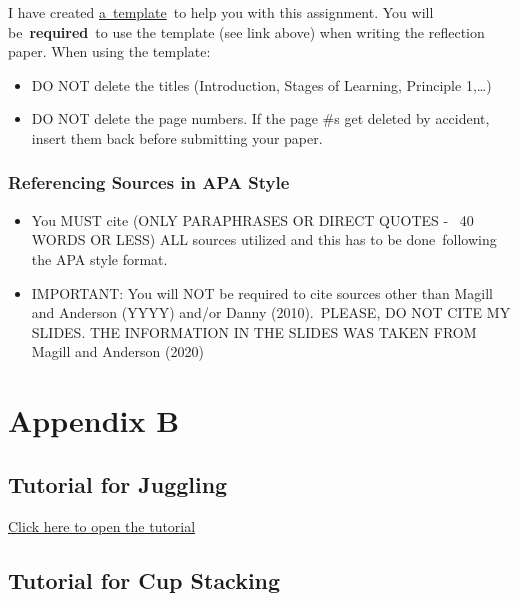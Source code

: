 \documentclass[
  letterpaper,
  DIV=11,
  numbers=noendperiod]{scrartcl}
\providecommand{\tightlist}{%
  \setlength{\itemsep}{0pt}\setlength{\parskip}{0pt}}\usepackage{longtable,booktabs,array}
\begin{document}
I have created
\href{https://docs.google.com/document/d/1zp0yN8EAQg6W9ecifHZ8NLonoi3ZMkrI/edit?usp=share_link\&ouid=102808224946914322692\&rtpof=true\&sd=true}{a~template}~to
help you with this assignment. You will be~\textbf{required}~to use the
template (see link above) when writing the reflection paper. When using
the template:

\begin{itemize}
\tightlist
\item
  DO NOT delete the titles (Introduction, Stages of Learning, Principle
  1,\ldots)
\item
  DO NOT delete the page numbers. If the page \#s get deleted by
  accident, insert them back before submitting your paper.
\end{itemize}

\hypertarget{referencing-sources-in-apa-style}{%
\subsubsection{Referencing Sources in APA
Style}\label{referencing-sources-in-apa-style}}

\begin{itemize}
\tightlist
\item
  You MUST cite (ONLY PARAPHRASES OR DIRECT QUOTES -~ 40 WORDS OR LESS)
  ALL sources utilized and this has to be done~following the APA style
  format.~
\item
  IMPORTANT: You will NOT be required to cite sources other than Magill
  and Anderson (YYYY) and/or Danny (2010).~PLEASE, DO NOT CITE MY
  SLIDES. THE INFORMATION IN THE SLIDES WAS TAKEN FROM Magill and
  Anderson (2020)
\end{itemize}

\hypertarget{sec-appendix-b}{%
\section{Appendix B}\label{sec-appendix-b}}

\hypertarget{tutorial-for-juggling}{%
\subsection{Tutorial for Juggling}\label{tutorial-for-juggling}}

\href{https://csun.h5p.com/content/1291224625924384828}{Click here to
open the tutorial}

\hypertarget{tutorial-for-cup-stacking}{%
\subsection{Tutorial for Cup Stacking}\label{tutorial-for-cup-stacking}}
\end{document}
